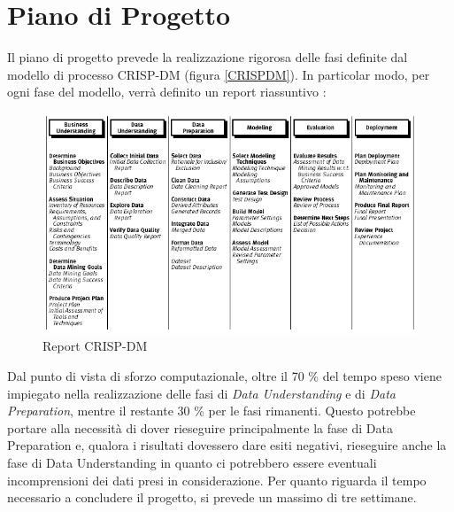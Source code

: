 \section{Piano di Progetto}
Il piano di progetto prevede la realizzazione rigorosa delle fasi definite dal modello di processo CRISP-DM (figura \ref{CRISPDM}).
In particolar modo, per ogni fase del modello, verrà definito un report riassuntivo : 
\begin{figure}[hbtp]
	\centering
	\includegraphics[width=1\textwidth]{./images/Metodologia_CRISP_DM.png}
	\caption{Report CRISP-DM}
	\label{Report_CRISPDM}
\end{figure}
Dal punto di vista di sforzo computazionale, oltre il 70 \% del tempo speso viene impiegato nella realizzazione delle fasi di \textit{Data Understanding} e di \textit{Data Preparation}, mentre il restante 30 \% per le fasi rimanenti.
Questo potrebbe portare alla necessità di dover rieseguire principalmente la fase di Data Preparation e, qualora i risultati dovessero dare esiti negativi, rieseguire anche la fase di Data Understanding in quanto ci potrebbero essere eventuali incomprensioni dei dati presi in considerazione.
Per quanto riguarda il tempo necessario a concludere il progetto, si prevede un massimo di tre settimane.